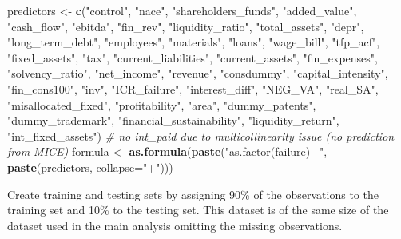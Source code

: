 \documentclass[]{article}
\newenvironment{Shaded}{\begin{snugshade}}{\end{snugshade}}
\newcommand{\CommentTok}[1]{\textcolor[rgb]{0.56,0.35,0.01}{\textit{#1}}}
\newcommand{\DataTypeTok}[1]{\textcolor[rgb]{0.13,0.29,0.53}{#1}}
\newcommand{\KeywordTok}[1]{\textcolor[rgb]{0.13,0.29,0.53}{\textbf{#1}}}
\newcommand{\NormalTok}[1]{#1}
\newcommand{\StringTok}[1]{\textcolor[rgb]{0.31,0.60,0.02}{#1}}
\begin{document}
\begin{Shaded}
\begin{Highlighting}[]
\NormalTok{predictors <-}\StringTok{ }\KeywordTok{c}\NormalTok{(}\StringTok{"control"}\NormalTok{, }\StringTok{"nace"}\NormalTok{, }\StringTok{"shareholders_funds"}\NormalTok{,}
                \StringTok{"added_value"}\NormalTok{, }\StringTok{"cash_flow"}\NormalTok{, }\StringTok{"ebitda"}\NormalTok{,}
                \StringTok{"fin_rev"}\NormalTok{, }\StringTok{"liquidity_ratio"}\NormalTok{, }\StringTok{"total_assets"}\NormalTok{,}
                \StringTok{"depr"}\NormalTok{, }\StringTok{"long_term_debt"}\NormalTok{, }\StringTok{"employees"}\NormalTok{,}
                \StringTok{"materials"}\NormalTok{, }\StringTok{"loans"}\NormalTok{, }\StringTok{"wage_bill"}\NormalTok{, }\StringTok{"tfp_acf"}\NormalTok{,}
                \StringTok{"fixed_assets"}\NormalTok{, }\StringTok{"tax"}\NormalTok{, }\StringTok{"current_liabilities"}\NormalTok{,}
                \StringTok{"current_assets"}\NormalTok{, }\StringTok{"fin_expenses"}\NormalTok{, }
                \StringTok{"solvency_ratio"}\NormalTok{, }\StringTok{"net_income"}\NormalTok{, }\StringTok{"revenue"}\NormalTok{,}
                \StringTok{"consdummy"}\NormalTok{, }\StringTok{"capital_intensity"}\NormalTok{, }\StringTok{"fin_cons100"}\NormalTok{,}
                \StringTok{"inv"}\NormalTok{, }\StringTok{"ICR_failure"}\NormalTok{, }\StringTok{"interest_diff"}\NormalTok{, }\StringTok{"NEG_VA"}\NormalTok{,}
                \StringTok{"real_SA"}\NormalTok{, }\StringTok{"misallocated_fixed"}\NormalTok{, }\StringTok{"profitability"}\NormalTok{,}
                \StringTok{"area"}\NormalTok{, }\StringTok{"dummy_patents"}\NormalTok{, }\StringTok{"dummy_trademark"}\NormalTok{,}
                \StringTok{"financial_sustainability"}\NormalTok{, }\StringTok{"liquidity_return"}\NormalTok{,}
                \StringTok{"int_fixed_assets"}\NormalTok{)}
\CommentTok{# no int_paid due to multicollinearity issue (no prediction from MICE)}
\NormalTok{formula <-}\StringTok{ }\KeywordTok{as.formula}\NormalTok{(}\KeywordTok{paste}\NormalTok{(}\StringTok{"as.factor(failure) ~"}\NormalTok{,}
                            \KeywordTok{paste}\NormalTok{(predictors, }\DataTypeTok{collapse=}\StringTok{"+"}\NormalTok{)))}
\end{Highlighting}
\end{Shaded}

Create training and testing sets by assigning 90\% of the observations
to the training set and 10\% to the testing set. This dataset is of the
same size of the dataset used in the main analysis omitting the missing
observations.
\end{document}
